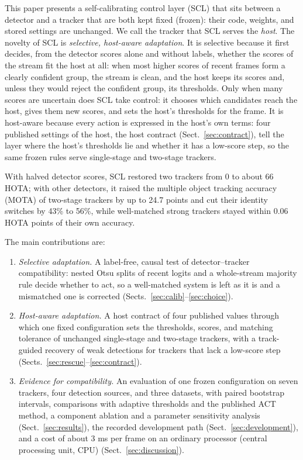 \documentclass[pdflatex,sn-mathphys-num,iicol]{sn-jnl}
\newcommand{\scl}{SCL}
\begin{document}
This paper presents a self-calibrating control layer (\scl{}) that sits between a detector and a
tracker that are both kept fixed (frozen): their code, weights, and stored settings are
unchanged. We call the tracker that \scl{} serves the \emph{host}. The novelty of \scl{} is
\emph{selective, host-aware adaptation}. It is selective because it first decides, from the
detector scores alone and without labels, whether the scores of the stream fit the host at all:
when most higher scores of recent frames form a clearly confident group, the stream is clean, and
the host keeps its scores and, unless they would reject the confident group, its thresholds. Only
when many scores are uncertain does \scl{} take control: it chooses which candidates reach the
host, gives them new scores, and sets the host's thresholds for the frame. It is host-aware because
every action is expressed in the host's own terms: four published settings of the host, the host
contract (Sect.~\ref{sec:contract}), tell the layer where the host's thresholds lie and whether it
has a low-score step, so the same frozen rules serve single-stage and two-stage trackers.

With halved detector scores, \scl{} restored two trackers from 0 to about 66 HOTA; with other
detectors, it raised the multiple object tracking accuracy (MOTA) of two-stage trackers by up to
24.7 points and cut their identity switches by 43\% to 56\%, while well-matched strong trackers
stayed within 0.06 HOTA points of their own accuracy.

The main contributions are:
\begin{enumerate}
\item \emph{Selective adaptation.} A label-free, causal test of detector--tracker compatibility:
      nested Otsu splits of recent logits and a whole-stream majority rule decide whether to act,
      so a well-matched system is left as it is and a mismatched one is corrected
      (Sects.~\ref{sec:calib}--\ref{sec:choice}).
\item \emph{Host-aware adaptation.} A host contract of four published values through which one
      fixed configuration sets the thresholds, scores, and matching tolerance of unchanged
      single-stage and two-stage trackers, with a track-guided recovery of weak detections for
      trackers that lack a low-score step (Sects.~\ref{sec:rescue}--\ref{sec:contract}).
\item \emph{Evidence for compatibility.} An evaluation of one frozen configuration on seven
      trackers, four detection sources, and three datasets, with paired bootstrap intervals,
      comparisons with adaptive thresholds and the published ACT method, a component ablation and a
      parameter sensitivity analysis (Sect.~\ref{sec:results}), the recorded development path
      (Sect.~\ref{sec:development}), and a cost of about 3 ms per frame on an ordinary processor
      (central processing unit, CPU) (Sect.~\ref{sec:discussion}).
\end{enumerate}
\end{document}

